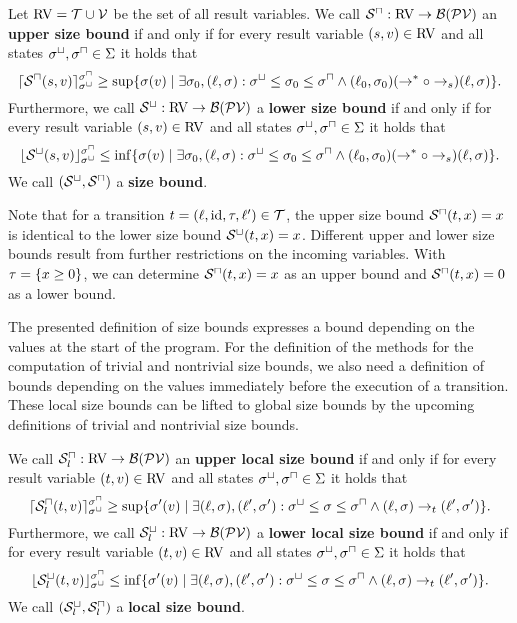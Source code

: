 \begin{definition}
  Let $\RV = \TSet \cup \VSet$ be the set of all result variables.
  We call $\USize: \RV \rightarrow \BoundSet(\PVSet)$ an \textbf{upper size bound} if and only if for every result variable $(\actt, v) \in \RV$ and all states $\lstate, \ustate \in \Valuation$ it holds that
  \[ \ueval{\USize(\actt, v)}{\lstate}{\ustate} \geq \usizeboundterm. \]
  Furthermore, we call $\LSize: \RV \rightarrow \BoundSet(\PVSet)$ a \textbf{lower size bound} if and only if for every result variable $(\actt, v) \in \RV$ and all states $\lstate, \ustate \in \Valuation$ it holds that
  \[ \leval{\LSize(\actt, v)}{\lstate}{\ustate} \leq \lsizeboundterm. \]
  We call $\Size$ a \textbf{size bound}.
\end{definition}

Note that for a transition $t = (\location,\text{id},\guard,\location') \in \TSet$, the upper size bound $\USize(t,x) = x$ is identical to the lower size bound $\LSize(t,x) = x$.
Different upper and lower size bounds result from further restrictions on the incoming variables.
With $\guard = \braced{x \geq 0}$, we can determine $\USize(t,x) = x$ as an upper bound and $\USize(t,x) = 0$ as a lower bound.

The presented definition of size bounds expresses a bound depending on the values at the start of the program.
For the definition of the methods for the computation of trivial and nontrivial size bounds, we also need a definition of bounds depending on the values immediately before the execution of a transition.
These local size bounds can be lifted to global size bounds by the upcoming definitions of trivial and nontrivial size bounds.

\begin{definition}
  We call $\ULSB: \RV \rightarrow \BoundSet(\PVSet)$ an \textbf{upper local size bound} if and only if for every result variable $(t, v) \in \RV$ and all states $\lstate, \ustate \in \Valuation$ it holds that
  \[ \ueval{\ULSB(t, v)}{\lstate}{\ustate} \geq \ulocalsizeboundterm. \]
  Furthermore, we call $\LLSB: \RV \rightarrow \BoundSet(\PVSet)$ a \textbf{lower local size bound} if and only if for every result variable $(t, v) \in \RV$ and all states $\lstate, \ustate \in \Valuation$ it holds that
  \[ \leval{\LLSB(t, v)}{\lstate}{\ustate} \leq \llocalsizeboundterm. \]
  We call $\LSB$ a \textbf{local size bound}.
\end{definition}



